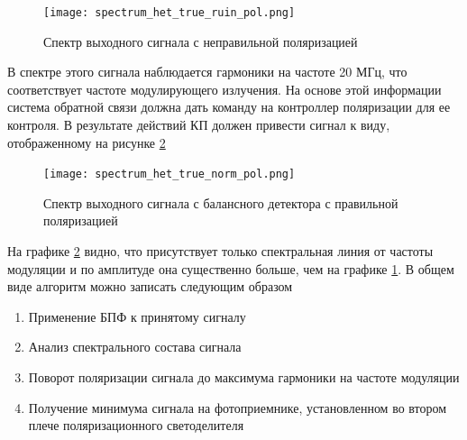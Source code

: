 \begin{figure}
    \centering
    \texttt{[image: spectrum\_het\_true\_ruin\_pol.png]}
    \caption{Спектр выходного сигнала с неправильной поляризацией }
    \label{fig:ruin pol}
\end{figure}
В спектре этого сигнала наблюдается гармоники на частоте 20 МГц, что соответствует частоте модулирующего излучения. На основе этой информации система обратной связи должна дать команду на контроллер поляризации для ее контроля. В результате действий КП должен привести сигнал к виду, отображенному на рисунке \ref{fig:norm pol}
\begin{figure}
    \centering
    \texttt{[image: spectrum\_het\_true\_norm\_pol.png]}
    \caption{Спектр выходного сигнала с балансного детектора с правильной поляризацией}
    \label{fig:norm pol}
\end{figure}
На графике \ref{fig:norm pol} видно, что присутствует только спектральная линия от частоты модуляции и по амплитуде она существенно больше, чем на графике \ref{fig:ruin pol}. 
В общем виде алгоритм можно записать следующим образом
\begin{enumerate}
    \item Применение БПФ к принятому сигналу
    \item Анализ спектрального состава сигнала
    \item Поворот поляризации сигнала до максимума гармоники на частоте модуляции
    \item Получение минимума сигнала на фотоприемнике, установленном во втором плече поляризационного светоделителя
\end{enumerate}
